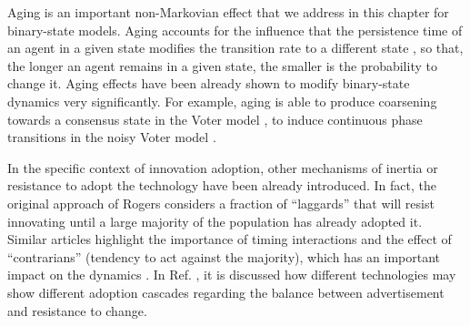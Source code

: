 Aging is an important non-Markovian effect that we address in this chapter for binary-state models. Aging accounts for the influence that the persistence time of an agent in a given state modifies the transition rate to a different state \cite{stark-2008,fernandez-gracia-2011,perez-2016,boguna-2014,chen-2020}, so that, the longer an agent remains in a given state, the smaller is the probability to change it. Aging effects have been already shown to modify binary-state dynamics very significantly. For example, aging is able to produce coarsening towards a consensus state in the Voter model \cite{fernandez-gracia-2011,peralta-2020C}, to induce continuous phase transitions in the noisy Voter model \cite{artime-2018,peralta-2020A}. 

In the specific context of innovation adoption, other mechanisms of inertia or resistance to adopt the technology have been already introduced. In fact, the original approach of Rogers \cite{rogers2014} considers a fraction of ``laggards'' that will resist innovating until a large majority of the population has already adopted it. Similar articles highlight the importance of timing interactions \cite{bass1969} and the effect of ``contrarians'' (tendency to act against the majority), which has an important impact on the dynamics \cite{galam-2008,goncalves-2012}. In Ref. \cite{goncalves-2012}, it is discussed how different technologies may show different adoption cascades regarding the balance between advertisement and resistance to change.


